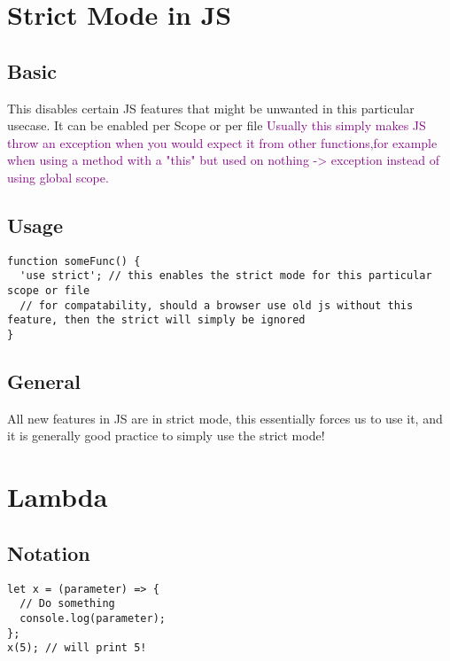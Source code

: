 \documentclass[main.tex,fontsize=6pt,paper=a4,paper=landscape,DIV=calc,]{scrartcl}
\begin{document}
\begin{multicols*}{4}
\section{Strict Mode in JS}


\subsection{Basic} 
This disables certain JS features that might be unwanted in this particular usecase. \newline
It can be enabled per Scope or per file\newline
\textcolor{purple}{Usually this simply makes JS throw an exception when you would expect it from other functions,for example when using a method with a "this" but used on nothing -> exception instead of using global scope.}

\subsection{Usage}  
\vspace{-2mm}
\begin{lstlisting}
function someFunc() {
  'use strict'; // this enables the strict mode for this particular scope or file
  // for compatability, should a browser use old js without this feature, then the strict will simply be ignored
}
\end{lstlisting}
\vspace{2mm}

\subsection{General}  
All new features in JS are in strict mode, this essentially forces us to use it, and it is generally good practice to simply use the strict mode!

\section{Lambda}

\subsection{Notation}  
\vspace{-2mm}
\begin{lstlisting}
let x = (parameter) => {
  // Do something
  console.log(parameter);
};
x(5); // will print 5!
\end{lstlisting}
\vspace{2mm}


\end{multicols*}
\end{document}
